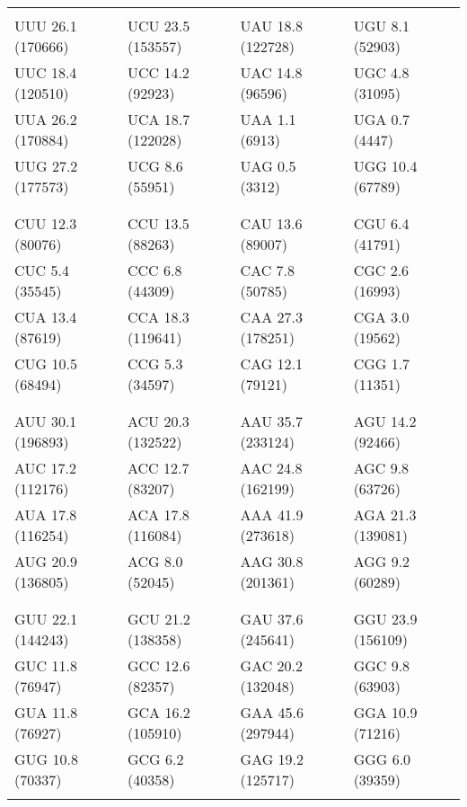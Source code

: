 \begin{center}
    \footnotesize
    \begin{tabu} to \textwidth{ | X[c] | X[c] | X[c] | X[c] | }
        \hline
        & & & \\
        UUU 26.1 (170666) & UCU 23.5 (153557) & UAU 18.8 (122728) & UGU  8.1  (52903) \\
        UUC 18.4 (120510) & UCC 14.2  (92923) & UAC 14.8  (96596) & UGC  4.8  (31095) \\
        UUA 26.2 (170884) & UCA 18.7 (122028) & UAA  1.1   (6913) & UGA  0.7   (4447) \\
        UUG 27.2 (177573) & UCG  8.6  (55951) & UAG  0.5   (3312) & UGG 10.4  (67789) \\
        & & & \\
        \hline
        & & & \\
        CUU 12.3  (80076) & CCU 13.5  (88263) & CAU 13.6  (89007) & CGU  6.4  (41791) \\
        CUC  5.4  (35545) & CCC  6.8  (44309) & CAC  7.8  (50785) & CGC  2.6  (16993) \\
        CUA 13.4  (87619) & CCA 18.3 (119641) & CAA 27.3 (178251) & CGA  3.0  (19562) \\
        CUG 10.5  (68494) & CCG  5.3  (34597) & CAG 12.1  (79121) & CGG  1.7  (11351) \\
        & & & \\
        \hline
        & & & \\
        AUU 30.1 (196893) & ACU 20.3 (132522) & AAU 35.7 (233124) & AGU 14.2  (92466) \\
        AUC 17.2 (112176) & ACC 12.7  (83207) & AAC 24.8 (162199) & AGC  9.8  (63726) \\
        AUA 17.8 (116254) & ACA 17.8 (116084) & AAA 41.9 (273618) & AGA 21.3 (139081) \\
        AUG 20.9 (136805) & ACG  8.0  (52045) & AAG 30.8 (201361) & AGG  9.2  (60289) \\
        & & & \\
        \hline
        & & & \\
        GUU 22.1 (144243) & GCU 21.2 (138358) & GAU 37.6 (245641) & GGU 23.9 (156109) \\
        GUC 11.8  (76947) & GCC 12.6  (82357) & GAC 20.2 (132048) & GGC  9.8  (63903) \\
        GUA 11.8  (76927) & GCA 16.2 (105910) & GAA 45.6 (297944) & GGA 10.9  (71216) \\
        GUG 10.8  (70337) & GCG  6.2  (40358) & GAG 19.2 (125717) & GGG  6.0  (39359) \\
        & & & \\
        \hline
    \end{tabu}
\end{center}

